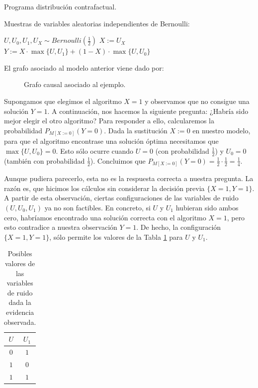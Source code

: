 \documentclass[oneside,openright,titlepage,numbers=noenddot,openany,headinclude,footinclude=true,
cleardoublepage=empty,abstractoff,BCOR=5mm,paper=a4,fontsize=12pt,main=spanish]{scrreprt}
\begin{document}
\clearpage

\begin{algorithm}[h]
\caption{Programa distribución contrafactual.}
    Muestras de variables aleatorias independientes de Bernoulli: 
    
    $U,U_0,U_1,U_X \sim  Bernoulli\left(\frac{1}{2}\right)$\;
    $X:=U_X$\;
    $Y:=X \cdot \max\{U,U_1\}+(1-X)\cdot \max\{U,U_0\}$ \;
    \label{alg:programa 4}
\end{algorithm}

El grafo asociado al modelo anterior viene dado por:

\begin{figure}[h]
\centering
{}
\caption{Grafo causal asociado al ejemplo.}
\end{figure}

Supongamos que elegimos el algoritmo $X = 1$ y observamos que no consigue una solución $Y = 1$. A continuación, nos hacemos la siguiente pregunta: ¿Habría sido mejor elegir el otro algoritmo? Para responder a ello, calcularemos la probabilidad $P_{M[X:=0]}(Y = 0)$. Dada la sustitución $X := 0$ en nuestro modelo, para que el algoritmo encontrase una solución óptima necesitamos que $\max\{U, U_0\} = 0$. Esto sólo ocurre cuando $U=0$ (con probabilidad $\frac{1}{2}$) y $U_0=0$ (también con probabilidad $\frac{1}{2}$). Concluimos que $P_{M[X:=0]}(Y = 0)=\frac{1}{2}\cdot \frac{1}{2}=\frac{1}{4}$.

Aunque pudiera parecerlo, esta no es la respuesta correcta a nuestra pregunta. La razón es, que hicimos los cálculos sin considerar la decisión previa $\{X = 1, Y = 1\}$. A partir de esta observación, ciertas configuraciones de las variables de ruido $(U, U_0, U_1)$ ya no son factibles. En concreto, si $U$ y $U_1$ hubieran sido ambos cero, habríamos encontrado una solución correcta con el algoritmo $X = 1$, pero esto contradice a nuestra observación $Y=1$. De hecho, la configuración $\{X = 1, Y = 1\}$, sólo permite los valores de la Tabla \ref{tab:contrafactualU} para $U$ y $U_1$.

\begin{table}[h]
\centering
\resizebox{2.0cm}{!} {
\begin{tabular}{cc}
\hline
$U$ & $U_1$ \\ \hline
$0$ & $1$   \\
$1$ & $0$   \\
$1$ & $1$   \\ \hline
\end{tabular}
}
\caption{Posibles valores de las variables de ruido dada la evidencia observada.}
\label{tab:contrafactualU}
\end{table}
\end{document}
